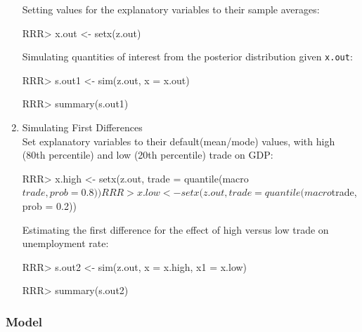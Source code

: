 \begin{enumerate}
Setting values for the explanatory variables to their sample averages:
\begin{Schunk}
\begin{Sinput}
RRR>  x.out <- setx(z.out)
\end{Sinput}
\end{Schunk}
Simulating quantities of interest from the posterior distribution given 
\texttt{x.out}:
\begin{Schunk}
\begin{Sinput}
RRR>  s.out1 <- sim(z.out, x = x.out)
\end{Sinput}
\end{Schunk}
\begin{Schunk}
\begin{Sinput}
RRR> summary(s.out1)
\end{Sinput}
\end{Schunk}
\item {Simulating First Differences} \\
Set explanatory variables to their default(mean/mode) values, with high
(80th percentile) and low (20th percentile) trade on GDP:
\begin{Schunk}
\begin{Sinput}
RRR>  x.high <- setx(z.out, trade = quantile(macro$trade, prob = 0.8))
RRR>  x.low <- setx(z.out, trade = quantile(macro$trade, prob = 0.2))
\end{Sinput}
\end{Schunk}
Estimating the first difference for the effect of
high versus low trade on unemployment rate:
\begin{Schunk}
\begin{Sinput}
RRR>  s.out2 <- sim(z.out, x = x.high, x1 = x.low)
\end{Sinput}
\end{Schunk}
\begin{Schunk}
\begin{Sinput}
RRR>  summary(s.out2)
\end{Sinput}
\end{Schunk}
\end{enumerate}

\subsubsection{Model}


